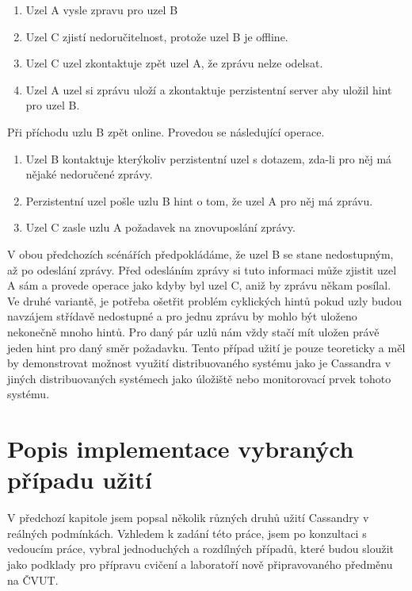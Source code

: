 \begin{enumerate}
\item Uzel A vysle zpravu pro uzel B
\item Uzel C zjistí nedoručitelnost, protože uzel B je offline.
\item Uzel C uzel zkontaktuje zpět uzel A, že zprávu nelze odelsat.
\item Uzel A uzel si zprávu uloží a zkontaktuje perzistentní server aby uložil hint pro uzel B.

\end{enumerate}

Při příchodu uzlu B zpět online. Provedou se následující operace.

\begin{enumerate}
\item Uzel B kontaktuje kterýkoliv perzistentní uzel s dotazem, zda-li pro něj má nějaké nedoručené zprávy.
\item Perzistentní uzel pošle uzlu B hint o tom, že uzel A pro něj má zprávu. 
\item Uzel C zasle uzlu A požadavek na znovuposlání zprávy.
\end{enumerate}


V obou předchozích scénářích předpokládáme, že uzel B se stane nedostupným, až po odeslání zprávy. Před odesláním zprávy si tuto informaci může zjistit uzel A sám a provede operace jako kdyby byl uzel C, aniž by zprávu někam posílal. Ve druhé variantě, je potřeba ošetřit problém cyklických hintů pokud uzly budou navzájem střídavě nedostupné a pro jednu zprávu by mohlo být uloženo nekonečně mnoho hintů. Pro daný pár uzlů nám vždy stačí mít uložen právě jeden hint pro daný směr požadavku. Tento případ užití je pouze teoreticky a měl by demonstrovat možnost využití distribuovaného systému jako je Cassandra v jiných distribuovaných systémech jako úložiště nebo monitorovací prvek tohoto systému. 


\chapter{Popis implementace vybraných případu užití}
V předchozí kapitole jsem popsal několik různých druhů užití Cassandry v reálných podmínkách. Vzhledem k zadání této práce, jsem po konzultaci s vedoucím práce, vybral jednoduchých a rozdílných případů, které budou sloužit jako podklady pro přípravu cvičení a laboratoří nově připravovaného předměnu na ČVUT.


